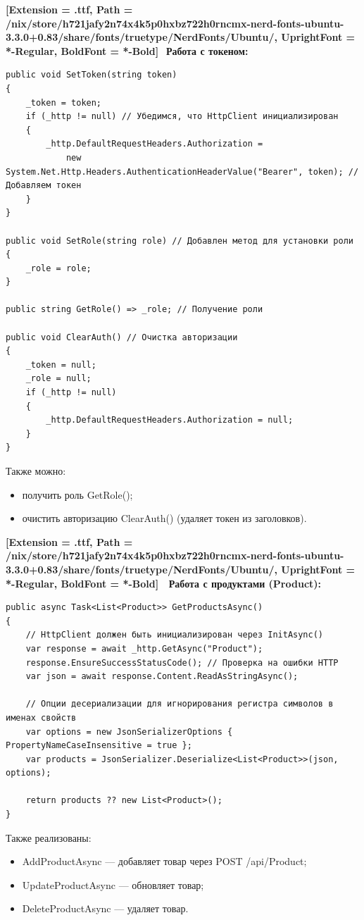 \documentclass[12pt]{article}
\newcommand{\icon}[1]{\fontspec{UbuntuNerdFont}[Extension = .ttf,
  Path = /nix/store/h721jafy2n74x4k5p0hxbz722h0rncmx-nerd-fonts-ubuntu-3.3.0+0.83/share/fonts/truetype/NerdFonts/Ubuntu/,
  UprightFont = *-Regular,
BoldFont = *-Bold] #1}
\newcommand{\iicon}[1]{{\icon{#1}}}
\renewcommand{\texttt}[1]{{\small\ttfamily #1}}
\numberwithin{listing}{section}
\numberwithin{figure}{section}
\begin{document}
\noindent \textbf{\iicon{} Работа с токеном:}
\begin{verbatim}
public void SetToken(string token)
{
    _token = token;
    if (_http != null) // Убедимся, что HttpClient инициализирован
    {
        _http.DefaultRequestHeaders.Authorization = 
            new System.Net.Http.Headers.AuthenticationHeaderValue("Bearer", token); // Добавляем токен
    }
}

public void SetRole(string role) // Добавлен метод для установки роли
{
    _role = role;
}

public string GetRole() => _role; // Получение роли

public void ClearAuth() // Очистка авторизации
{
    _token = null;
    _role = null;
    if (_http != null)
    {
        _http.DefaultRequestHeaders.Authorization = null;
    }
}
\end{verbatim}
Также можно:
\begin{itemize}
	\item получить роль \texttt{GetRole()};
	\item очистить авторизацию \texttt{ClearAuth()} (удаляет токен из заголовков).
\end{itemize}

\noindent \textbf{\iicon{} Работа с продуктами (Product):}
\begin{verbatim}
public async Task<List<Product>> GetProductsAsync()
{
    // HttpClient должен быть инициализирован через InitAsync()
    var response = await _http.GetAsync("Product"); 
    response.EnsureSuccessStatusCode(); // Проверка на ошибки HTTP
    var json = await response.Content.ReadAsStringAsync();

    // Опции десериализации для игнорирования регистра символов в именах свойств
    var options = new JsonSerializerOptions { PropertyNameCaseInsensitive = true };
    var products = JsonSerializer.Deserialize<List<Product>>(json, options);

    return products ?? new List<Product>();
}
\end{verbatim}
Также реализованы:
\begin{itemize}
	\item \texttt{AddProductAsync} — добавляет товар через POST \texttt{/api/Product};
	\item \texttt{UpdateProductAsync} — обновляет товар;
	\item \texttt{DeleteProductAsync} — удаляет товар.
\end{itemize}
\end{document}
